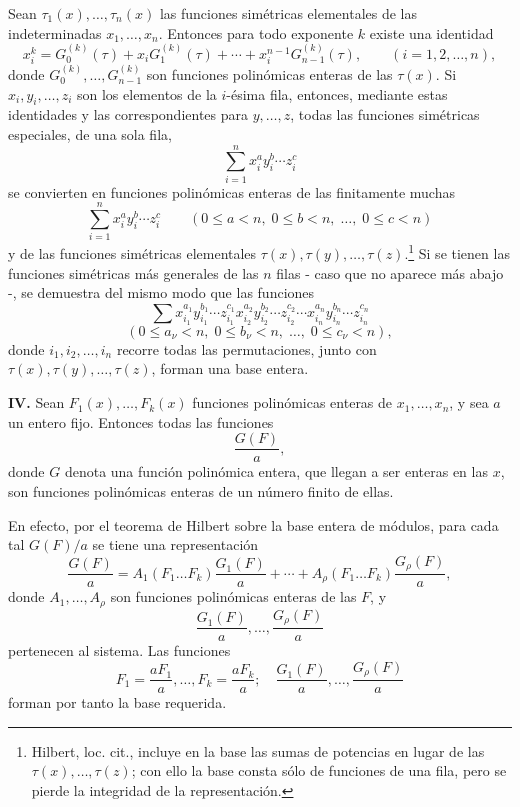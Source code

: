 \documentclass[11pt]{article}
\begin{document}
Sean \(\tau_1(x),\ldots,\tau_n(x)\) las funciones simétricas elementales de las indeterminadas \(x_1,\ldots,x_n\). Entonces para todo exponente \(k\) existe una identidad
\[
        x_i^k = G_0^{(k)}(\tau)+x_iG_1^{(k)}(\tau)+\cdots+x_i^{n-1}G_{n-1}^{(k)}(\tau),
        \qquad (i=1,2,\ldots,n),
\]
donde \(G_0^{(k)},\ldots,G_{n-1}^{(k)}\) son funciones polinómicas enteras de las \(\tau(x)\). Si \(x_i,y_i,\ldots,z_i\) son los elementos de la \(i\)-ésima fila, entonces, mediante estas identidades y las correspondientes para \(y,\ldots,z\), todas las funciones simétricas especiales, de una sola fila,
\[
        \sum_{i=1}^n x_i^{a}y_i^{b}\cdots z_i^{c}
\]
se convierten en funciones polinómicas enteras de las finitamente muchas
\[
        \sum_{i=1}^n x_i^{a}y_i^{b}\cdots z_i^{c}
        \qquad
        (0\le a<n,\;0\le b<n,\;\ldots,\;0\le c<n)
\]
y de las funciones simétricas elementales \(\tau(x),\tau(y),\ldots,\tau(z)\).\footnote{Hilbert, loc. cit., incluye en la base las sumas de potencias en lugar de las \(\tau(x),\ldots,\tau(z)\); con ello la base consta sólo de funciones de una fila, pero se pierde la integridad de la representación.}
Si se tienen las funciones simétricas más generales de las \(n\) filas - caso que no aparece más abajo -, se demuestra del mismo modo que las funciones
\[
        \sum x_{i_1}^{a_1}y_{i_1}^{b_1}\cdots z_{i_1}^{c_1}
              x_{i_2}^{a_2}y_{i_2}^{b_2}\cdots z_{i_2}^{c_2}
              \cdots
              x_{i_n}^{a_n}y_{i_n}^{b_n}\cdots z_{i_n}^{c_n}
\]
\[
        (0\le a_\nu<n,\;0\le b_\nu<n,\;\ldots,\;0\le c_\nu<n),
\]
donde \(i_1,i_2,\ldots,i_n\) recorre todas las permutaciones, junto con \(\tau(x),\tau(y),\ldots,\tau(z)\), forman una base entera.

\textbf{IV.} Sean \(F_1(x),\ldots,F_k(x)\) funciones polinómicas enteras de \(x_1,\ldots,x_n\), y sea \(a\) un entero fijo. Entonces todas las funciones
\[
        \frac{G(F)}{a},
\]
donde \(G\) denota una función polinómica entera, que llegan a ser enteras en las \(x\), son funciones polinómicas enteras de un número finito de ellas.

En efecto, por el teorema de Hilbert sobre la base entera de módulos, para cada tal \(G(F)/a\) se tiene una representación
\[
 \frac{G(F)}{a}
 =
 A_1(F_1\ldots F_k)\frac{G_1(F)}{a}
 +\cdots+
 A_\rho(F_1\ldots F_k)\frac{G_\rho(F)}{a},
\]
donde \(A_1,\ldots,A_\rho\) son funciones polinómicas enteras de las \(F\), y
\[
        \frac{G_1(F)}{a},\ldots,\frac{G_\rho(F)}{a}
\]
pertenecen al sistema. Las funciones
\[
        F_1=\frac{aF_1}{a},\ldots,F_k=\frac{aF_k}{a};
        \quad
        \frac{G_1(F)}{a},\ldots,\frac{G_\rho(F)}{a}
\]
forman por tanto la base requerida.
\end{document}
